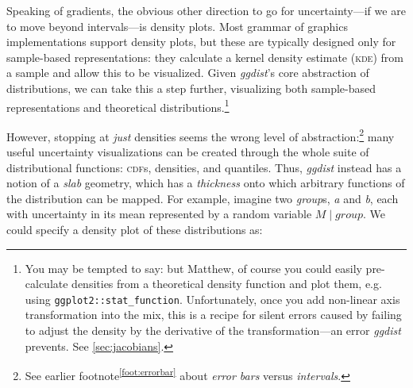 \documentclass[journal]{vgtc}                     %
\begin{document}
Speaking of gradients, the obvious other direction to go for uncertainty---if we are to move beyond intervals---is density plots. Most grammar of graphics implementations support density plots, but these are typically designed only for sample-based representations: they calculate a kernel density estimate (\textsc{kde}) from a sample and allow this to be visualized. Given \textit{ggdist}'s core abstraction of distributions, we can take this a step further, visualizing both sample-based representations and theoretical distributions.\footnote{\label{foot:jacobians}You may be tempted to say: but Matthew, of course you could easily pre-calculate densities from a theoretical density function and plot them, e.g. using \texttt{ggplot2::stat\_function}. Unfortunately, once you add non-linear axis transformation into the mix, this is a recipe for silent errors caused by failing to adjust the density by the derivative of the transformation---an error \textit{ggdist} prevents. See \cref{sec:jacobians}.} 

However, stopping at \textit{just} densities seems the wrong level of abstraction:\footnote{See earlier footnote\textsuperscript{\ref{foot:errorbar}} about \textit{error bars} versus \textit{intervals}.} many useful uncertainty visualizations can be created through the whole suite of distributional functions: \textsc{cdf}s, densities, and quantiles. Thus, \textit{ggdist} instead has a notion of a \textit{slab} geometry, which has a \textit{thickness} onto which arbitrary functions of the distribution can be mapped. For example, imagine two \textit{group}s, \textit{a} and \textit{b}, each with uncertainty in its mean represented by a random variable $M \mid group$. We could specify a density plot of these distributions as:
\end{document}
